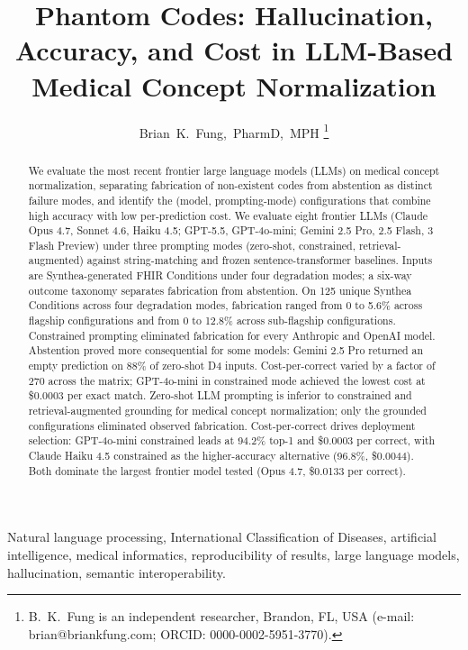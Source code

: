 \documentclass[journal]{IEEEtran}
\title{Phantom Codes: Hallucination, Accuracy, and Cost in
LLM-Based Medical Concept Normalization}
\author{Brian~K.~Fung,~PharmD,~MPH%
\thanks{B.~K.~Fung is an independent researcher,
Brandon, FL, USA (e-mail: brian@briankfung.com;
ORCID: 0000-0002-5951-3770).}}
\begin{document}
\maketitle

\begin{abstract}
We evaluate the most recent frontier large language models (LLMs)
on medical concept normalization, separating fabrication of
non-existent codes from abstention as distinct failure modes, and
identify the (model, prompting-mode) configurations that combine
high accuracy with low per-prediction cost. We evaluate eight
frontier LLMs (Claude Opus 4.7, Sonnet 4.6, Haiku 4.5; GPT-5.5,
GPT-4o-mini; Gemini 2.5 Pro, 2.5 Flash, 3 Flash Preview) under
three prompting modes (zero-shot, constrained, retrieval-augmented)
against string-matching and frozen sentence-transformer baselines.
Inputs are Synthea-generated FHIR Conditions under four degradation
modes; a six-way outcome taxonomy separates fabrication from
abstention. On 125 unique Synthea Conditions across four
degradation modes, fabrication ranged from 0 to 5.6\% across
flagship configurations and from 0 to 12.8\% across sub-flagship
configurations. Constrained prompting eliminated fabrication for
every Anthropic and OpenAI model. Abstention proved more
consequential for some models: Gemini 2.5 Pro returned an empty
prediction on 88\% of zero-shot D4 inputs. Cost-per-correct varied
by a factor of 270 across the matrix; GPT-4o-mini in constrained
mode achieved the lowest cost at \$0.0003 per exact match.
Zero-shot LLM prompting is inferior to constrained and
retrieval-augmented grounding for medical concept normalization;
only the grounded configurations eliminated observed fabrication.
Cost-per-correct drives deployment selection: GPT-4o-mini
constrained leads at 94.2\% top-1 and \$0.0003 per correct, with
Claude Haiku 4.5 constrained as the higher-accuracy alternative
(96.8\%, \$0.0044). Both dominate the largest frontier model tested
(Opus 4.7, \$0.0133 per correct).
\end{abstract}

\begin{IEEEkeywords}
Natural language processing, International Classification of
Diseases, artificial intelligence, medical informatics,
reproducibility of results, large language models, hallucination,
semantic interoperability.
\end{IEEEkeywords}

\end{document}
